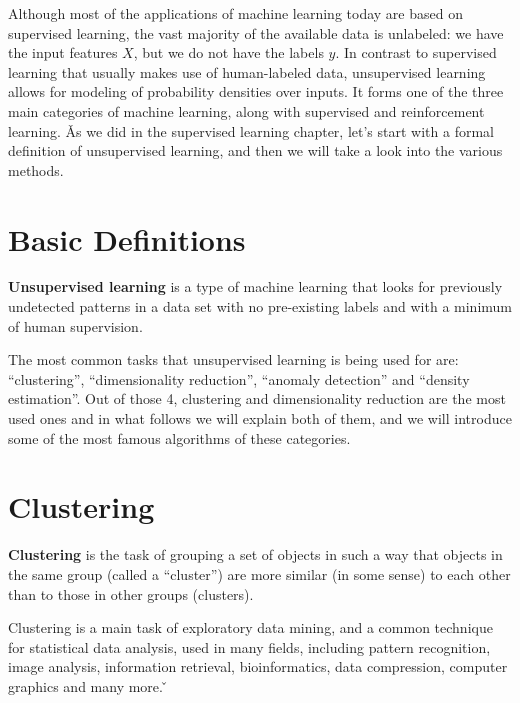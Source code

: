 Although most of the applications of machine learning today are based on supervised learning, the vast majority of 
the available data is unlabeled: we have the input features $X$, but we do not have the labels $y$. In contrast to 
supervised learning that usually makes use of human-labeled data, unsupervised learning allows for modeling of 
probability densities over inputs. It forms one of the three main categories of machine learning, along with 
supervised and reinforcement learning. \v

As we did in the supervised learning chapter, let's start with a formal definition of unsupervised learning, and 
then we will take a look into the various methods.

\section{Basic Definitions}

\textbf{Unsupervised learning} is a type of machine learning that looks for previously undetected patterns in a data 
set with no pre-existing labels and with a minimum of human supervision. 
\ed


The most common tasks that unsupervised learning is being used for are: ``clustering'', ``dimensionality reduction'',
``anomaly detection'' and ``density estimation''. Out of those 4, clustering and dimensionality reduction are the most
used ones and in what follows we will explain both of them, and we will introduce some of the most famous algorithms 
of these categories.

\section{Clustering}

\bd[Clustering]
\textbf{Clustering} is the task of grouping a set of objects in such a way that objects in the same group (called a 
``cluster'') are more similar (in some sense) to each other than to those in other groups (clusters).
\ed

Clustering is a main task of exploratory data mining, and a common technique for statistical data analysis, used in 
many fields, including pattern recognition, image analysis, information retrieval, bioinformatics, data 
compression, computer graphics and many more. \v

